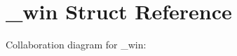 \hypertarget{struct__win}{}\section{\+\_\+win Struct Reference}
\label{struct__win}


Collaboration diagram for \+\_\+win\+:
